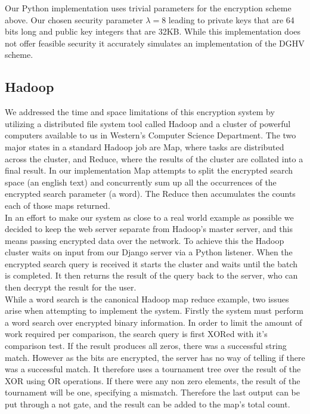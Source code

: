 \documentclass[letterpaper,11pt]{article} %
\begin{document}
Our Python implementation uses trivial parameters for the encryption scheme above. Our chosen security parameter $\lambda=8$ leading to private keys that are 64 bits long and public key integers that are 32KB. While this implementation does not offer feasible security it accurately simulates an implementation of the DGHV scheme.


\subsection*{Hadoop}


 We addressed the time and space limitations of this encryption system by utilizing a distributed file system tool called Hadoop and a cluster of powerful computers available to us in Western's Computer Science Department. The two major states in a standard Hadoop job are Map, where tasks are distributed across the cluster, and Reduce, where the results of the cluster are collated into a final result. In our implementation Map attempts to split the encrypted search space (an english text) and concurrently sum up all the occurrences of the encrypted search parameter (a word). The Reduce then accumulates the counts each of those maps returned. \\

In an effort to make our system as close to a real world example as possible we decided to keep the web server separate from Hadoop's master server, and this means passing encrypted data over the network. To achieve this the Hadoop cluster waits on input from our Django server via a Python listener. When the encrypted search query is received it starts the cluster and waits until the batch is completed. It then returns the result of the query back to the server, who can then decrypt the result for the user. \\

While a word search is the canonical Hadoop map reduce example, two issues arise when attempting to implement the system. Firstly the system must perform a word search over encrypted binary information. In order to limit the amount of work required per comparison, the search query is first XORed with it's comparison test. If the result produces all zeros, there was a successful string match. However as the bits are encrypted, the server has no way of telling if there was a successful match. It therefore uses a tournament tree over the result of the XOR using OR operations. If there were any non zero elements, the result of the tournament will be one, specifying a mismatch. Therefore the last output can be put through a not gate, and the result can be added to the map's total count. \\
\end{document}

